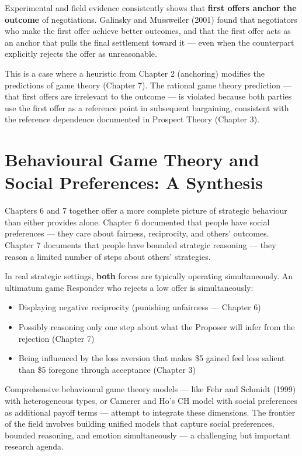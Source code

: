 \documentclass[12pt, letterpaper]{article}
\begin{document}
Experimental and field evidence consistently shows that \textbf{first offers anchor the outcome} of negotiations. Galinsky and Mussweiler (2001) found that negotiators who make the first offer achieve better outcomes, and that the first offer acts as an anchor that pulls the final settlement toward it --- even when the counterpart explicitly rejects the offer as unreasonable.

This is a case where a heuristic from Chapter 2 (anchoring) modifies the predictions of game theory (Chapter 7). The rational game theory prediction --- that first offers are irrelevant to the outcome --- is violated because both parties use the first offer as a reference point in subsequent bargaining, consistent with the reference dependence documented in Prospect Theory (Chapter 3).

\medskip


\section{Behavioural Game Theory and Social Preferences: A Synthesis}


Chapters 6 and 7 together offer a more complete picture of strategic behaviour than either provides alone. Chapter 6 documented that people have social preferences --- they care about fairness, reciprocity, and others' outcomes. Chapter 7 documents that people have bounded strategic reasoning --- they reason a limited number of steps about others' strategies.

In real strategic settings, \textbf{both} forces are typically operating simultaneously. An ultimatum game Responder who rejects a low offer is simultaneously:
\begin{itemize}
\item Displaying negative reciprocity (punishing unfairness --- Chapter 6)
\item Possibly reasoning only one step about what the Proposer will infer from the rejection (Chapter 7)
\item Being influenced by the loss aversion that makes \$5 gained feel less salient than \$5 foregone through acceptance (Chapter 3)
\end{itemize}

Comprehensive behavioural game theory models --- like Fehr and Schmidt (1999) with heterogeneous types, or Camerer and Ho's CH model with social preferences as additional payoff terms --- attempt to integrate these dimensions. The frontier of the field involves building unified models that capture social preferences, bounded reasoning, and emotion simultaneously --- a challenging but important research agenda.
\end{document}
